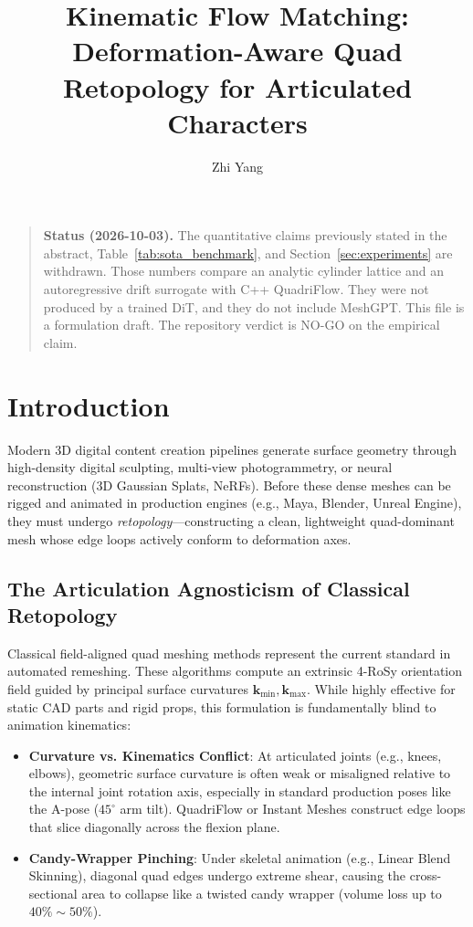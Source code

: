 \documentclass[acmtog,nonacm]{acmart}
\title{Kinematic Flow Matching: Deformation-Aware Quad Retopology for Articulated Characters}
\author{Zhi Yang}
\affiliation{%
  \institution{Independent}
  \country{}
}
\begin{document}
\maketitle

\begin{quote}
\noindent\textbf{Status (2026-10-03).}
The quantitative claims previously stated in the abstract, Table~\ref{tab:sota_benchmark}, and Section~\ref{sec:experiments} are withdrawn.
Those numbers compare an analytic cylinder lattice and an autoregressive drift surrogate with C++ QuadriFlow.
They were not produced by a trained DiT, and they do not include MeshGPT.
This file is a formulation draft. The repository verdict is NO-GO on the empirical claim.
\end{quote}

\section{Introduction}
Modern 3D digital content creation pipelines generate surface geometry through high-density digital sculpting, multi-view photogrammetry, or neural reconstruction (3D Gaussian Splats, NeRFs). Before these dense meshes can be rigged and animated in production engines (e.g., Maya, Blender, Unreal Engine), they must undergo \emph{retopology}---constructing a clean, lightweight quad-dominant mesh whose edge loops actively conform to deformation axes.

\subsection{The Articulation Agnosticism of Classical Retopology}
Classical field-aligned quad meshing methods \cite{bommes2009mixed,jakob2015instant,huang2018quadriflow} represent the current standard in automated remeshing. These algorithms compute an extrinsic 4-RoSy orientation field guided by principal surface curvatures $\mathbf{k}_{\min}, \mathbf{k}_{\max}$. While highly effective for static CAD parts and rigid props, this formulation is fundamentally blind to animation kinematics:
\begin{itemize}
    \item \textbf{Curvature vs. Kinematics Conflict}: At articulated joints (e.g., knees, elbows), geometric surface curvature is often weak or misaligned relative to the internal joint rotation axis, especially in standard production poses like the A-pose ($45^\circ$ arm tilt). QuadriFlow or Instant Meshes construct edge loops that slice diagonally across the flexion plane.
    \item \textbf{Candy-Wrapper Pinching}: Under skeletal animation (e.g., Linear Blend Skinning), diagonal quad edges undergo extreme shear, causing the cross-sectional area to collapse like a twisted candy wrapper (volume loss up to $40\%\sim 50\%$).
\end{itemize}
\end{document}
